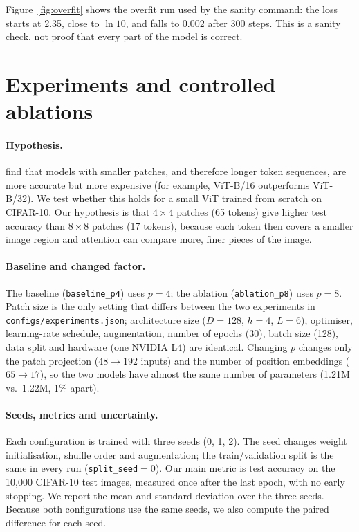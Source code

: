 \documentclass{article}
\begin{document}
Figure~\ref{fig:overfit} shows the overfit run used by the sanity command:
the loss starts at 2.35, close to $\ln 10$, and falls to 0.002 after 300
steps. This is a sanity check, not proof that every part of the model is correct.

\section{Experiments and controlled ablations}


\paragraph{Hypothesis.}
\citet{dosovitskiy2021image} find that models with smaller patches, and
therefore longer token sequences, are more accurate but more expensive (for
example, ViT-B/16 outperforms ViT-B/32). We test whether this holds for a
small ViT trained from scratch on CIFAR-10. Our hypothesis is that
$4\times4$ patches (65 tokens) give higher test accuracy than $8\times8$
patches (17 tokens), because each token then covers a smaller image region
and attention can compare more, finer pieces of the image.

\paragraph{Baseline and changed factor.}
The baseline (\texttt{baseline\_p4}) uses $p{=}4$; the ablation
(\texttt{ablation\_p8}) uses $p{=}8$. Patch size is the only setting that
differs between the two experiments in \texttt{configs/experiments.json};
architecture size ($D{=}128$, $h{=}4$, $L{=}6$), optimiser, learning-rate
schedule, augmentation, number of epochs (30), batch size (128), data split
and hardware (one NVIDIA L4) are identical. Changing $p$ changes only the
patch projection ($48\to192$ inputs) and the number of position
embeddings ($65\to17$), so the two models have almost the same number of
parameters (1.21M vs.\ 1.22M, 1\% apart). %


\paragraph{Seeds, metrics and uncertainty.}
Each configuration is trained with three seeds (0, 1, 2). The seed changes
weight initialisation, shuffle order and augmentation; the train/validation
split is the same in every run (\texttt{split\_seed}${}=0$). Our main metric
is test accuracy on the 10{,}000 CIFAR-10 test images, measured once after
the last epoch, with no early stopping. We report the mean and standard
deviation over the three seeds. Because both configurations use the same
seeds, we also compute the paired difference for each seed.
\end{document}
